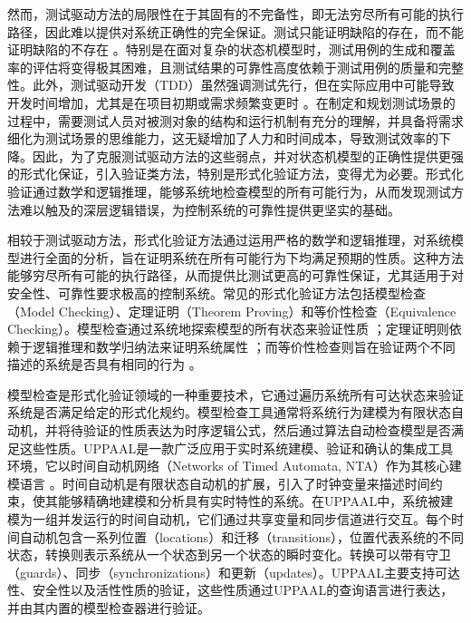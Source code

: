 然而，测试驱动方法的局限性在于其固有的不完备性，即无法穷尽所有可能的执行路径，因此难以提供对系统正确性的完全保证。测试只能证明缺陷的存在，而不能证明缺陷的不存在 。特别是在面对复杂的状态机模型时，测试用例的生成和覆盖率的评估将变得极其困难，且测试结果的可靠性高度依赖于测试用例的质量和完整性。此外，测试驱动开发（TDD）虽然强调测试先行，但在实际应用中可能导致开发时间增加，尤其是在项目初期或需求频繁变更时 。在制定和规划测试场景的过程中，需要测试人员对被测对象的结构和运行机制有充分的理解，并具备将需求细化为测试场景的思维能力，这无疑增加了人力和时间成本，导致测试效率的下降。因此，为了克服测试驱动方法的这些弱点，并对状态机模型的正确性提供更强的形式化保证，引入验证类方法，特别是形式化验证方法，变得尤为必要。形式化验证通过数学和逻辑推理，能够系统地检查模型的所有可能行为，从而发现测试方法难以触及的深层逻辑错误，为控制系统的可靠性提供更坚实的基础。

相较于测试驱动方法，形式化验证方法通过运用严格的数学和逻辑推理，对系统模型进行全面的分析，旨在证明系统在所有可能行为下均满足预期的性质。这种方法能够穷尽所有可能的执行路径，从而提供比测试更高的可靠性保证，尤其适用于对安全性、可靠性要求极高的控制系统。常见的形式化验证方法包括模型检查（Model Checking）、定理证明（Theorem Proving）和等价性检查（Equivalence Checking）。模型检查通过系统地探索模型的所有状态来验证性质 ；定理证明则依赖于逻辑推理和数学归纳法来证明系统属性 ；而等价性检查则旨在验证两个不同描述的系统是否具有相同的行为 。

模型检查是形式化验证领域的一种重要技术，它通过遍历系统所有可达状态来验证系统是否满足给定的形式化规约。模型检查工具通常将系统行为建模为有限状态自动机，并将待验证的性质表达为时序逻辑公式，然后通过算法自动检查模型是否满足这些性质。UPPAAL是一款广泛应用于实时系统建模、验证和确认的集成工具环境，它以时间自动机网络（Networks of Timed Automata, NTA）作为其核心建模语言 。时间自动机是有限状态自动机的扩展，引入了时钟变量来描述时间约束，使其能够精确地建模和分析具有实时特性的系统。在UPPAAL中，系统被建模为一组并发运行的时间自动机，它们通过共享变量和同步信道进行交互。每个时间自动机包含一系列位置（locations）和迁移（transitions），位置代表系统的不同状态，转换则表示系统从一个状态到另一个状态的瞬时变化。转换可以带有守卫（guards）、同步（synchronizations）和更新（updates）。UPPAAL主要支持可达性、安全性以及活性性质的验证，这些性质通过UPPAAL的查询语言进行表达，并由其内置的模型检查器进行验证。

